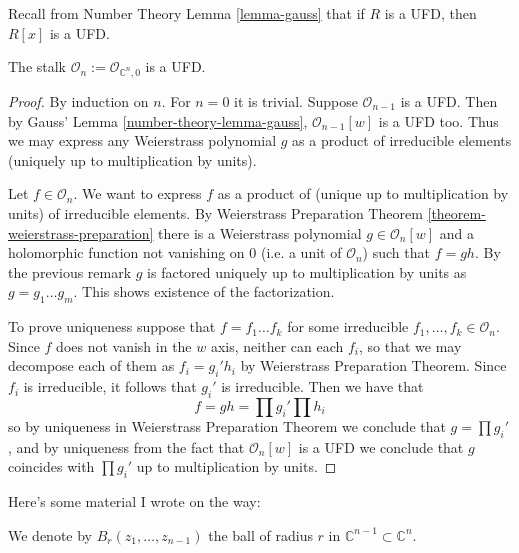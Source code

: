 \noindent
Recall from Number Theory Lemma \ref{lemma-gauss}
that if $R$ is a UFD, then $R[x]$ is a UFD.

\begin{lemma}
\label{lemma-stalk-is-UFD}
The stalk $\mathcal{O}_n:=\mathcal{O}_{\mathbb{C}^n,0}$ is a UFD.
\end{lemma}

\begin{proof}
By induction on $n$. For $n=0$ it is trivial. Suppose $\mathcal{O}_{n-1}$ is a
UFD. Then by Gauss' Lemma \ref{number-theory-lemma-gauss}, 
$\mathcal{O}_{n-1}[w]$ is a UFD
too. Thus we may express any Weierstrass polynomial $g$ as a product of
irreducible elements (uniquely up to multiplication by units).

Let $f\in \mathcal{O}_n$. We want to express $f$ as a product of (unique up to
multiplication by units) of irreducible elements. By Weierstrass Preparation
Theorem \ref{theorem-weierstrass-preparation} there is a Weierstrass polynomial
$g\in\mathcal{O}_n[w]$ and a holomorphic function not vanishing on $0$ (i.e. a
unit of $\mathcal{O}_n$) such that $f=gh$. By the previous remark $g$ is
factored uniquely up to multiplication by units as $g=g_1\ldots g_m$. This shows
existence of the factorization.

To prove uniqueness suppose that $f=f_1\ldots f_k$ for some irreducible
$f_1,\ldots,f_k\in\mathcal{O}_n$. Since $f$ does not vanish in the $w$ axis,
neither can each $f_i$, so that we may decompose each of them as  $f_i=g_i'h_i$
by Weierstrass Preparation Theorem. Since $f_i$ is irreducible, it follows that
$g_i'$ is irreducible. Then we have that $$ f=gh=\prod g_i'\prod h_i $$ so by
uniqueness in Weierstrass Preparation Theorem we conclude that $g=\prod g_i'$,
and by uniqueness from the fact that  $\mathcal{O}_n[w]$ is a UFD we conclude
that $g$ coincides with $\prod g_i'$ up to multiplication by units.
\end{proof}

\medskip\noindent
Here's some material I wrote on the way:

We denote by $B_r(z_1,\ldots,z_{n-1})$ the ball of radius $r$ in
$\mathbb{C}^{n-1}\subset\mathbb{C}^n$.

